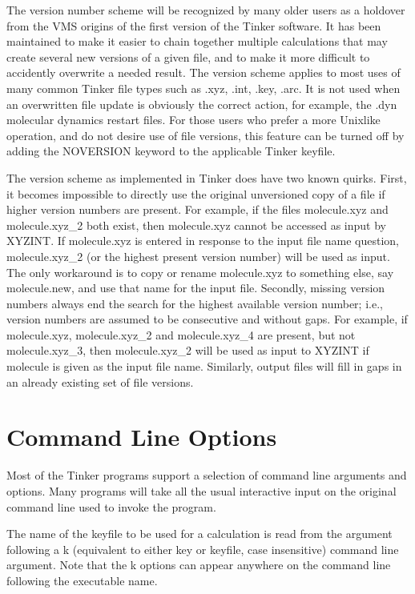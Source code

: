 \documentclass[letterpaper,11pt,english]{sphinxmanual}
\begin{document}
\sphinxAtStartPar
The version number scheme will be recognized by many older users as a holdover from the VMS origins of the first version of the Tinker software. It has been maintained to make it easier to chain together multiple calculations that may create several new versions of a given file, and to make it more difficult to accidently overwrite a needed result. The version scheme applies to most uses of many common Tinker file types such as .xyz, .int, .key, .arc. It is not used when an overwritten file update is obviously the correct action, for example, the .dyn molecular dynamics restart files. For those users who prefer a more Unix\sphinxhyphen{}like operation, and do not desire use of file versions, this feature can be turned off by adding the NOVERSION keyword to the applicable Tinker keyfile.

\sphinxAtStartPar
The version scheme as implemented in Tinker does have two known quirks. First, it becomes impossible to directly use the original unversioned copy of a file if higher version numbers are present. For example, if the files molecule.xyz and molecule.xyz\_2 both exist, then molecule.xyz cannot be accessed as input by XYZINT. If molecule.xyz is entered in response to the input file name question, molecule.xyz\_2 (or the highest present version number) will be used as input. The only workaround is to copy or rename molecule.xyz to something else, say molecule.new, and use that name for the input file. Secondly, missing version numbers always end the search for the highest available version number; i.e., version numbers are assumed to be consecutive and without gaps. For example, if molecule.xyz, molecule.xyz\_2 and molecule.xyz\_4 are present, but not molecule.xyz\_3, then molecule.xyz\_2 will be used as input to XYZINT if molecule is given as the input file name. Similarly, output files will fill in gaps in an already existing set of file versions.


\section{Command Line Options}
\label{\detokenize{text/special-features:command-line-options}}
\sphinxAtStartPar
Most of the Tinker programs support a selection of command line arguments and options. Many programs will take all the usual interactive input on the original command line used to invoke the program.

\sphinxAtStartPar
The name of the keyfile to be used for a calculation is read from the argument following a \sphinxhyphen{}k (equivalent to either \sphinxhyphen{}key or \sphinxhyphen{}keyfile, case insensitive) command line argument. Note that the \sphinxhyphen{}k options can appear anywhere on the command line following the executable name.
\end{document}
